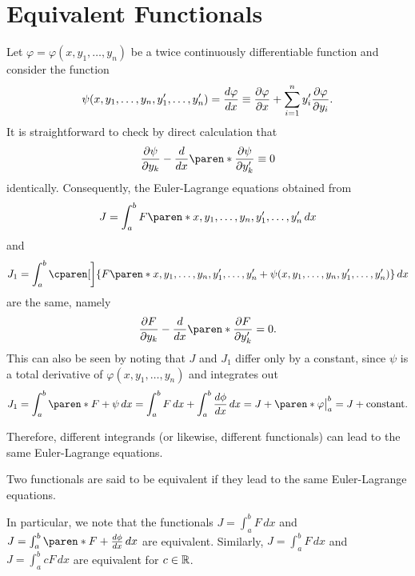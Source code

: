 \documentclass[11pt]{penrose}
\begin{document}
\section{Equivalent Functionals}
Let $\varphi = \varphi(x, y_1, \dots, y_n)$ be a twice continuously differentiable function and consider the function
\begin{equation}
    \psi(x, y_1, \dots, y_n, y'_1, \dots, y'_n)
    = \frac{d\varphi}{dx}
    \equiv \frac{\partial \varphi}{\partial x} + \sum_{i=1}^{n} y'_i \frac{\partial \varphi}{\partial y_i}.
\end{equation}
It is straightforward to check by direct calculation that
\begin{equation}
    \frac{\pd \psi}{\pd y_k} - \frac{d}{dx} \paren*{\frac{\pd \psi}{\pd y'_k}} \equiv 0
\end{equation}
identically. Consequently, the Euler-Lagrange equations obtained from
\begin{equation}
    J = \int_a^b F\paren*{x, y_1, \dots, y_n, y'_1, \dots, y'_n} \,dx
\end{equation}
and
\begin{equation}
    J_1 = \int_a^b \cparen[\bigg]{F\paren*{x, y_1, \dots, y_n, y'_1, \dots, y'_n} + \psi(x, y_1, \dots, y_n, y'_1, \dots, y'_n)} \,dx
\end{equation}
are the same, namely
\begin{equation}
    \frac{\pd F}{\pd y_k} - \frac{d}{dx} \paren*{\frac{\pd F}{\pd y'_k}} = 0.
\end{equation}
This can also be seen by noting that $J$ and $J_1$ differ only by a constant, since $\psi$ is a total derivative of $\varphi(x, y_1, \dots, y_n)$ and integrates out
\begin{equation}
    J_1 = \int_a^b \paren*{F + \psi} \,dx
    = \int_a^b F \,dx + \int_a^b \frac{d\phi}{dx} \,dx
    = J + \paren*{\big. \varphi \big|_a^b}
    = J + \text{constant}.
\end{equation}

Therefore, different integrands (or likewise, different functionals) can lead to the same Euler-Lagrange equations.

Two functionals are said to be equivalent if they lead to the same Euler-Lagrange equations.

In particular, we note that the functionals $J = \int_a^b F \,dx$ and $J = \int_a^b \paren*{F + \frac{d\phi}{dx}} \,dx$ are equivalent. Similarly, $J = \int_a^b F \,dx$ and $J = \int_a^b cF \,dx$ are equivalent for $c \in \mathbb{R}$.
\end{document}
